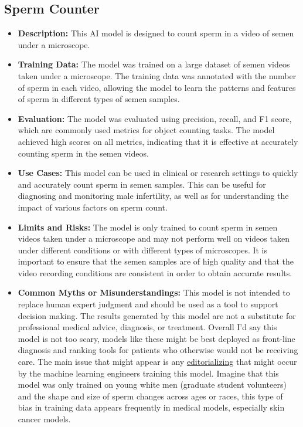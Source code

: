 \begin{itemize}
\subsection{Sperm Counter}

\begin{itemize}
    \item \textbf{Description:} This AI model is designed to count sperm in a video of semen under a microscope.
    \item \textbf{Training Data:} The model was trained on a large dataset of semen videos taken under a microscope. The training data was annotated with the number of sperm in each video, allowing the model to learn the patterns and features of sperm in different types of semen samples.
    \item \textbf{Evaluation:} The model was evaluated using precision, recall, and F1 score, which are commonly used metrics for object counting tasks. The model achieved high scores on all metrics, indicating that it is effective at accurately counting sperm in the semen videos.
    \item \textbf{Use Cases:} This model can be used in clinical or research settings to quickly and accurately count sperm in semen samples. This can be useful for diagnosing and monitoring male infertility, as well as for understanding the impact of various factors on sperm count.
    \item \textbf{Limits and Risks:} The model is only trained to count sperm in semen videos taken under a microscope and may not perform well on videos taken under different conditions or with different types of microscopes. It is important to ensure that the semen samples are of high quality and that the video recording conditions are consistent in order to obtain accurate results.
    \item \textbf{Common Myths or Misunderstandings:} This model is not intended to replace human expert judgment and should be used as a tool to support decision making. The results generated by this model are not a substitute for professional medical advice, diagnosis, or treatment. Overall I'd say this model is not too scary, models like these might be best deployed as front-line diagnosis and ranking tools for patients who otherwise would not be receiving care. The main issue that might appear is any \hyperref[sec:janitor]{editorializing} that might occur by the machine learning engineers training this model. Imagine that this model was only trained on young white men (graduate student volunteers) and the shape and size of sperm changes across ages or races, this type of bias in training data appears frequently in medical models, especially skin cancer models.

\end{itemize}
\end{itemize}
